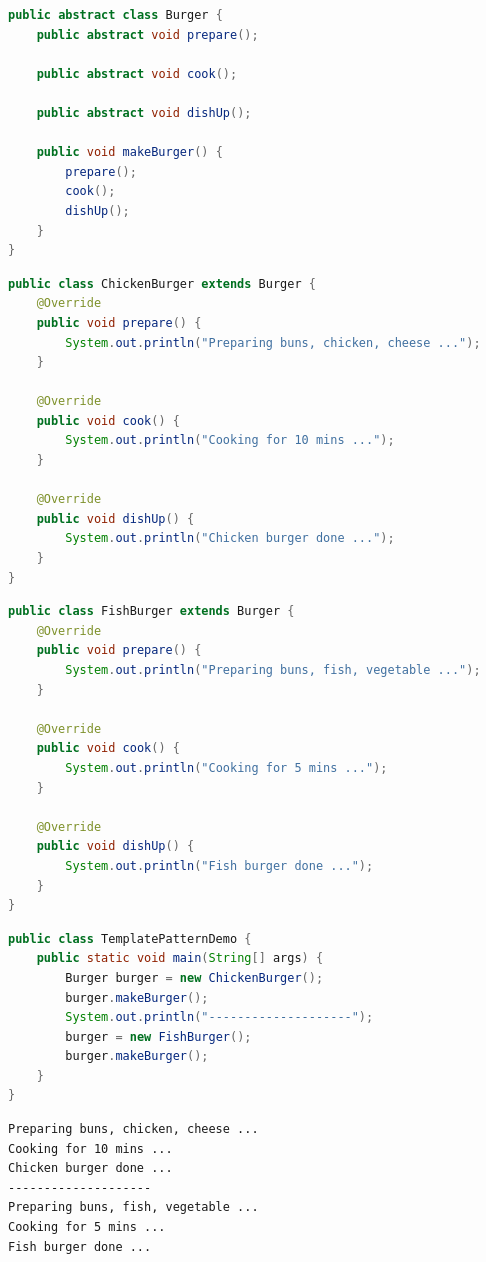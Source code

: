 \vspace{0.5cm}

\begin{lstlisting}[language=Java, title=Burger.java]
public abstract class Burger {
    public abstract void prepare();

    public abstract void cook();

    public abstract void dishUp();

    public void makeBurger() {
        prepare();
        cook();
        dishUp();
    }
}
\end{lstlisting}

\begin{lstlisting}[language=Java, title=ChickenBurger.java]
public class ChickenBurger extends Burger {
    @Override
    public void prepare() {
        System.out.println("Preparing buns, chicken, cheese ...");
    }

    @Override
    public void cook() {
        System.out.println("Cooking for 10 mins ...");
    }

    @Override
    public void dishUp() {
        System.out.println("Chicken burger done ...");
    }
}
\end{lstlisting}

\begin{lstlisting}[language=Java, title=FishBurger.java]
public class FishBurger extends Burger {
    @Override
    public void prepare() {
        System.out.println("Preparing buns, fish, vegetable ...");
    }

    @Override
    public void cook() {
        System.out.println("Cooking for 5 mins ...");
    }

    @Override
    public void dishUp() {
        System.out.println("Fish burger done ...");
    }
}
\end{lstlisting}

\begin{lstlisting}[language=Java, title=TemplatePatternDemo.java]
public class TemplatePatternDemo {
    public static void main(String[] args) {
        Burger burger = new ChickenBurger();
        burger.makeBurger();
        System.out.println("--------------------");
        burger = new FishBurger();
        burger.makeBurger();
    }
}
\end{lstlisting}

\begin{tcolorbox}
    \begin{verbatim}
Preparing buns, chicken, cheese ...
Cooking for 10 mins ...
Chicken burger done ...
--------------------
Preparing buns, fish, vegetable ...
Cooking for 5 mins ...
Fish burger done ...
\end{verbatim}
\end{tcolorbox}

